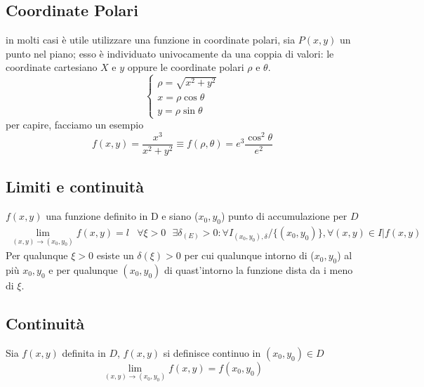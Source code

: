 \subsection{Coordinate Polari}
\begin{defi}
  in molti casi è utile utilizzare una funzione in coordinate polari, sia $P(x,y)$ un punto nel piano; esso
  è individuato univocamente da una coppia di valori: le coordinate cartesiano $X$ e $y$ oppure le coordinate
  polari $\rho$ e $\theta$.
  \begin{equation*}
    \begin{cases}
      \rho =\sqrt{x^2+y^2}\\
      x=\rho\cos\theta\\
      y=\rho\sin\theta
    \end{cases}
  \end{equation*}
  per capire, facciamo un esempio
  \begin{equation}
    f(x,y)=\frac{x^3}{x^2+y^2}\equiv f(\rho,\theta)=e^3\frac{\cos^2\theta}{e^2}
  \end{equation} 
\end{defi}
\subsection{Limiti e continuità}
\begin{defi}
  $f(x,y)$ una funzione definito in D e siano ($x_0,y_0$) punto di accumulazione per $D$
  \begin{equation}
    \begin{matrix}
      \lim\limits_{(x,y)\to(x_0,y_0)} f(x,y) = l & \forall\xi>0\text{ } \exists \delta_{(E)}>0:\forall I_{(x_0,y_0),\delta}
                                            /\{(x_0,y_0)\}, \forall(x,y)\in I | f(x,y)
    \end{matrix}
  \end{equation}
  Per qualunque $\xi > 0$ esiste un $\delta(\xi)>0$ per cui qualunque intorno di ($x_0,y_0$) al più $x_0,y_0$ e
  per qualunque $(x_0,y_0)$ di quast'intorno la funzione dista da i meno di $\xi$.
\end{defi}
\subsection{Continuità}
\begin{defi}
  Sia $f(x,y)$ definita in $D$, $f(x,y)$ si definisce {\color{red} continuo} in $(x_0,y_0)\in D$
  \begin{equation}
    \lim\limits_{(x,y)\to(x_0,y_0)}f(x,y)=f(x_0,y_0)
  \end{equation}
\end{defi}
